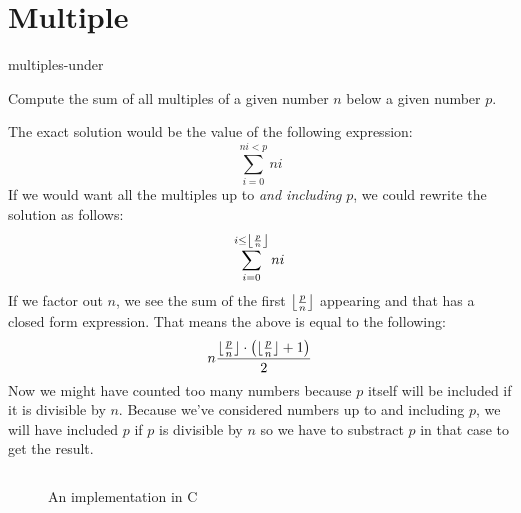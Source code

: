 \documentclass[main.tex]{subfiles}
\begin{document}
\chapter{Multiple}

\begin{libraryfile}
  \begin{algorithm}{1}{1}{multiples-under}
    \begin{algorithm-description}
        Compute the sum of all multiples of a given number $n$ below a given number $p$.
    \end{algorithm-description}
    \begin{algorithm-explanation}
      The exact solution would be the value of the following expression:
      \[ \sum_{i=0}^{ni < p}ni \]
      If we would want all the multiples up to \textit{and including} $p$, we could rewrite the solution as follows:
      \[ \sum_{i=0}^{i \le \floor*{\frac{p}{n}}}ni \]
      If we factor out $n$, we see the sum of the first $\floor*{\frac{p}{n}}$ appearing and that has a closed form expression.
      That means the above is equal to the following:
      \[ n\frac{\floor{\frac{p}{n}}\cdot \left(\floor{\frac{p}{n}} + 1\right)}{2} \]
      Now we might have counted too many numbers because $p$ itself will be included if it is divisible by $n$.
      Because we've considered numbers up to and including $p$, we will have included $p$ if $p$ is divisible by $n$ so we have to substract $p$ in that case to get the result.

      \begin{figure}[H]
        \centering
        \inputminted[firstline=6, lastline=7]{c}{\lib{c}{multiple.c}}
        \caption{An implementation in C}
      \end{figure}
    \end{algorithm-explanation}
  \end{algorithm}
\end{libraryfile}
\end{document}
